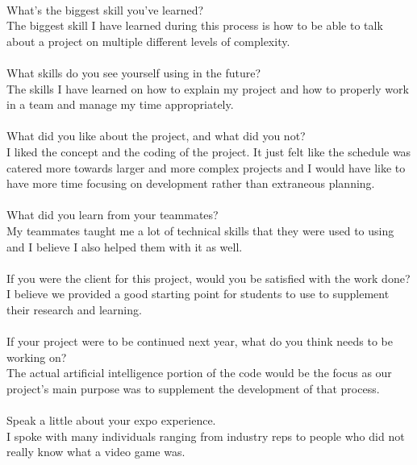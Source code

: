 \documentclass[10pt,letterpaper,onecolumn,draftclsnofoot]{IEEEtran}
\begin{document}
\\
What's the biggest skill you've learned?\\
The biggest skill I have learned during this process is how to be able to talk about a project on multiple different levels of complexity.\\
\\
What skills do you see yourself using in the future?\\
The skills I have learned on how to explain my project and how to properly work in a team and manage my time appropriately.\\
\\
What did you like about the project, and what did you not?\\
I liked the concept and the coding of the project. It just felt like the schedule was catered more towards larger and more complex projects and I would have like to have more time focusing on development rather than extraneous planning.\\
\\
What did you learn from your teammates?\\
My teammates taught me a lot of technical skills that they were used to using and I believe I also helped them with it as well.\\
\\
If you were the client for this project, would you be satisfied with the work done?\\
I believe we provided a good starting point for students to use to supplement their research and learning.\\
\\
If your project were to be continued next year, what do you think needs to be working on?\\
The actual artificial intelligence portion of the code would be the focus as our project's main purpose was to supplement the development of that process.\\
\\
Speak a little about your expo experience.\\
I spoke with many individuals ranging from industry reps to people who did not really know what a video game was.\\
\end{document}
